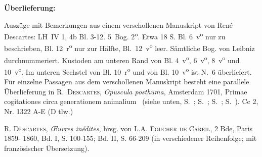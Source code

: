 \begin{ledgroupsized}[r]{120mm}
\footnotesize 
\pstart                
\noindent\textbf{\"{U}berlieferung:}   
\pend
\end{ledgroupsized}
\begin{ledgroupsized}[r]{114mm}
\footnotesize 
\pstart \parindent -6mm
%
Auszüge mit Bemerkungen aus einem verschollenen Manuskript
von René Descartes:\protect{}
LH~IV 1, 4b Bl. 3-12.
5~Bog. 2\textsuperscript{o}.
Etwa 18 S.
Bl. 6~v\textsuperscript{o} nur zu  beschrieben,
Bl. 12~r\textsuperscript{o} nur zur Hälfte,
Bl.~12~v\textsuperscript{o} leer.
Sämtliche Bog. von Leibniz durchnummeriert.
Kustoden am unteren Rand von Bl. 4~v\textsuperscript{o}, 6~v\textsuperscript{o}, 8~v\textsuperscript{o} und 10~v\textsuperscript{o}.
Im unteren Sechstel von Bl. 10~r\textsuperscript{o} und von Bl. 10~v\textsuperscript{o} ist N.~6 %
überliefert.
Für einzelne Passagen aus dem verschollenen Manuskript
besteht eine parallele Überlieferung in \cite{01144}\textsc{R.~Descartes}, \textit{Opuscula posthuma}, Amsterdam 1701, \glqq Primae co\-gi\-ta\-tio\-nes circa generationem animalium\grqq~%
(siehe unten, S.~; S.~;  S.~; S.~).
\newline%
Cc 2, Nr. 1322 A-E (D tlw.)
\pend
\end{ledgroupsized}
%
\begin{ledgroupsized}[r]{114mm}
\footnotesize 
\pstart \parindent -6mm
%
\cite{01121}\textsc{R. Descartes}, \textit{{\OE}uvres in\'{e}dites}, hrsg. von \textsc{L.A. Foucher de Careil}, 2 Bde, Paris 1859- 1860, Bd. I, S. 100-155; Bd. II, S. 66-209 (in verschiedener Reihenfolge; mit franz\"{o}sischer \"{U}bersetzung).
\pend
\end{ledgroupsized}

